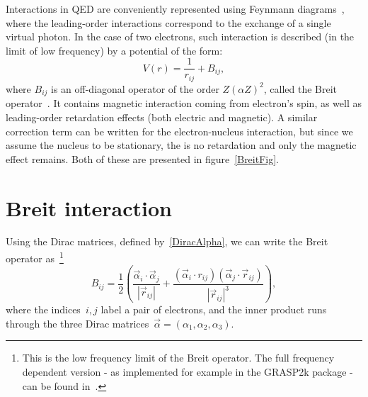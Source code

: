  Interactions in QED are conveniently represented using Feynmann diagrams~\cite{FD}, where the leading-order interactions correspond to the exchange of a single virtual photon. In the case of two electrons, such interaction is described (in the limit of low frequency) by a potential of the form:
 \begin{equation}
     V(r) = \frac{1}{r_{ij}} + B_{ij},
 \end{equation}
 where $B_{ij}$ is an off-diagonal operator of the order $Z(\alpha Z)^2$, called the Breit operator~\cite{bethe2014quantum}. It contains magnetic interaction coming from electron's spin, as well as leading-order retardation effects (both electric and magnetic). A similar correction term can be written for the electron-nucleus interaction, but since we assume the nucleus to be stationary, the is no retardation and only the magnetic effect remains. Both of these are presented in figure~\ref{BreitFig}.

\section{Breit interaction}

Using the Dirac matrices, defined by~\eqref{DiracAlpha}, we can write the Breit operator as~\cite{bethe2014quantum}\footnote{This is the low frequency limit of the Breit operator. The full frequency dependent version - as implemented for example in the GRASP2k package - can be found in~\cite{Si2019CriticalEO}.}
\begin{equation}
B_{ij} = \frac{1}{2}\left(\frac{\vec{\alpha}_i \cdot \vec{\alpha}_j}{|\vec{r}_{ij}|}+\frac{(\vec{\alpha}_i \cdot r_{ij}) (\vec{\alpha}_j \cdot \vec{r}_{ij})}{|\vec{r}_{ij}|^3}\right),
\end{equation}
where the indices~$i,j$ label a pair of electrons, and the inner product runs through the three Dirac matrices~$\vec{\alpha} = (\alpha_1, \alpha_2, \alpha_3)$.

